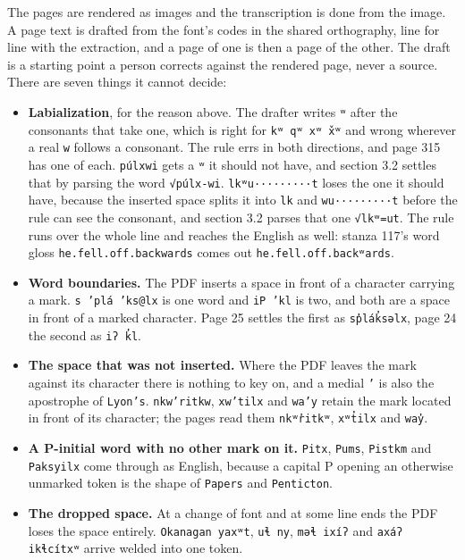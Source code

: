 The pages are rendered as images and the transcription is done from the image. A page text is drafted from the font's codes in the shared orthography, line for line with the extraction, and a page of one is then a page of the other. The draft is a starting point a person corrects against the rendered page, never a source. There are seven things it cannot decide:

\begin{itemize}
\item \textbf{Labialization}, for the reason above. The drafter writes \texttt{ʷ} after the consonants that take one, which is right for \texttt{kʷ qʷ xʷ x̌ʷ} and wrong wherever a real \texttt{w} follows a consonant. The rule errs in both directions, and page 315 has one of each. \texttt{púlxwi} gets a \texttt{ʷ} it should not have, and section 3.2 settles that by parsing the word \texttt{√púlx-wi}. \texttt{lkʷu·········t} loses the one it should have, because the inserted space splits it into \texttt{lk} and \texttt{wu·········t} before the rule can see the consonant, and section 3.2 parses that one \texttt{√lkʷ=ut}. The rule runs over the whole line and reaches the English as well: stanza 117's word gloss \texttt{he.fell.off.backwards} comes out \texttt{he.fell.off.backʷards}.
\item \textbf{Word boundaries.} The PDF inserts a space in front of a character carrying a mark. \texttt{s ’plá ’ks@lx} is one word and \texttt{iP ’kl} is two, and both are a space in front of a marked character. Page 25 settles the first as \texttt{sp̓lák̓səlx}, page 24 the second as \texttt{iʔ k̓l}.
\item \textbf{The space that was not inserted.} Where the PDF leaves the mark against its character there is nothing to key on, and a medial \texttt{’} is also the apostrophe of \texttt{Lyon’s}. \texttt{nkw’ritkw}, \texttt{xw’tilx} and \texttt{wa’y} retain the mark located in front of its character; the pages read them \texttt{nkʷr̓itkʷ}, \texttt{xʷt̓ilx} and \texttt{way̓}.
\item \textbf{A P-initial word with no other mark on it.} \texttt{Pitx}, \texttt{Pums}, \texttt{Pistkm} and \texttt{Paksyilx} come through as English, because a capital P opening an otherwise unmarked token is the shape of \texttt{Papers} and \texttt{Penticton}.
\item \textbf{The dropped space.} At a change of font and at some line ends the PDF loses the space entirely. \texttt{Okanagan yaxʷt}, \texttt{uɬ ny}, \texttt{məɬ ixíʔ} and \texttt{axáʔ ikɬcítxʷ} arrive welded into one token.

\end{itemize}
